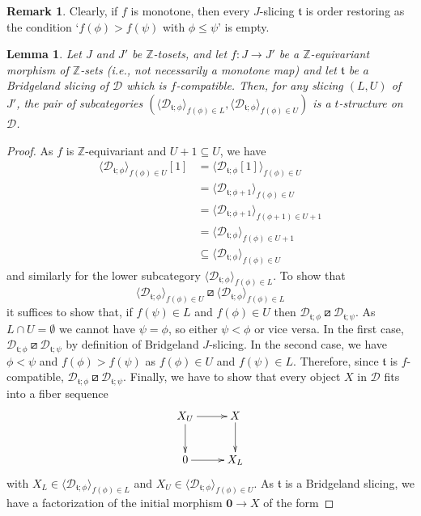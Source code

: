 \documentclass{article}
\newtheorem{lem}[thm]{Lemma}
\theoremstyle{definition}
\newtheorem{rem}[thm]{Remark}
\newcommand{\Z}{\mathbb{Z}}
\newcommand{\tee}{\mathfrak{t}}
\newcommand{\orth}{\boxslash}
\begin{document}
\begin{rem}
Clearly, if $f$ is monotone, then every $J$-slicing $\tee$ is order restoring as the condition `$f(\phi)>f(\psi)$ with $\phi\leq \psi$' is empty.
\end{rem}

\begin{lem}\label{is-t-structure}
Let $J$ and $J'$ be $\Z$-tosets, and let $f\colon J\to J'$ be a $\Z$-equivariant morphism of $\Z$-sets (i.e., not necessarily a monotone map) and let $\tee$ be a Bridgeland slicing of $\mathscr{D}$ which is $f$-compatible. Then, for any slicing $(L,U)$ of $J'$, the pair of subcategories
$(\langle \mathscr{D}_{\tee;\phi}\rangle_{f(\phi)\in L},\langle \mathscr{D}_{\tee;\phi}\rangle_{f(\phi)\in U})$ is a $t$-structure on $\mathscr{D}$.
\end{lem}
\begin{proof}
As $f$ is $\Z$-equivariant and $U+1\subseteq U$, we have
\begin{align*}
\langle \mathscr{D}_{\tee;\phi}\rangle_{f(\phi)\in U}[1]&=\langle \mathscr{D}_{\tee;\phi}[1]\rangle_{f(\phi)\in U}\\
&=\langle \mathscr{D}_{\tee;\phi+1}\rangle_{f(\phi)\in U}\\
&=\langle \mathscr{D}_{\tee;\phi+1}\rangle_{f(\phi+1)\in U+1}\\
&=\langle \mathscr{D}_{\tee;\phi}\rangle_{f(\phi)\in U+1}\\
&\subseteq \langle \mathscr{D}_{\tee;\phi}\rangle_{f(\phi)\in U}
\end{align*}
and similarly for the lower subcategory $\langle \mathscr{D}_{\tee;\phi}\rangle_{f(\phi)\in L}$. To show that 
\[
\langle \mathscr{D}_{\tee;\phi}\rangle_{f(\phi)\in U}\orth \langle \mathscr{D}_{\tee;\phi}\rangle_{f(\phi)\in L}
\]
it suffices to show that, if $f(\psi)\in L$ and $f(\phi)\in U$ then $\mathscr{D}_{\tee;\phi}\orth \mathscr{D}_{\tee;\psi}$. As $L\cap U=\emptyset$ we cannot have $\psi=\phi$, so either $\psi<\phi$ or vice versa. In the first case, $\mathscr{D}_{\tee;\phi}\orth \mathscr{D}_{\tee;\psi}$ by definition of Bridgeland $J$-slicing. In the second case, we have $\phi<\psi$ and $f(\phi)>f(\psi)$ as $f(\phi)\in U$ and  $f(\psi)\in L$. Therefore, since $\tee$ is $f$-compatible, $\mathscr{D}_{\tee;\phi}\orth\mathscr{D}_{\tee;\psi}$. Finally, we have to show that every object $X$ in $\mathscr{D}$ fits into a fiber sequence
\[
\xymatrix{
X_U\ar[r]\ar[d] & X\ar[d]\\
0\ar[r] & X_L
}
\]
with $X_L\in \langle \mathscr{D}_{\tee;\phi}\rangle_{f(\phi)\in L}$ and $X_U\in \langle \mathscr{D}_{\tee;\phi}\rangle_{f(\phi)\in U}$. As $\tee$ is a Bridgeland slicing, we have a factorization of the initial morphism $\mathbf{0} \to X$ of the form

\end{proof}
\end{document}
